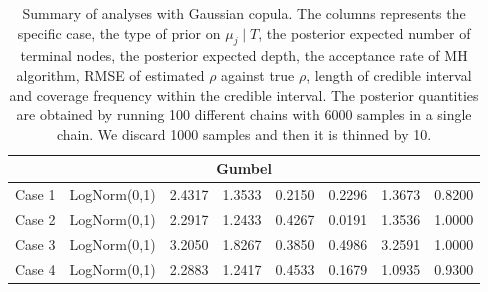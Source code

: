 \documentclass{amsart}
\begin{document}
\begin{table}[ht]
{\begin{tabular}{ll|cccccc}
		\midrule
		\multicolumn{8}{c}{Gumbel} \\
		\midrule
		Case 1 & LogNorm(0,1) & 2.4317 & 1.3533 & 0.2150 & 0.2296 & 1.3673 & 0.8200 \\ 
		Case 2 & LogNorm(0,1) & 2.2917 & 1.2433 & 0.4267 & 0.0191 & 1.3536 & 1.0000 \\ 
		Case 3 & LogNorm(0,1) & 3.2050 & 1.8267 & 0.3850 & 0.4986 & 3.2591 & 1.0000 \\ 
		Case 4 & LogNorm(0,1) & 2.2883 & 1.2417 & 0.4533 & 0.1679 & 1.0935 & 0.9300 \\ 
		\bottomrule
		\end{tabular}}
	\caption{Summary of analyses with Gaussian copula. The columns represents the specific case, the type of prior on $\mu_j\mid T$, the posterior expected number of terminal nodes, the posterior expected depth, the acceptance rate of MH algorithm, RMSE of estimated $\rho$ against true $\rho$, length of credible interval and coverage frequency within the credible interval. The posterior quantities are obtained by running 100 different chains with 6000 samples in a single chain. We discard 1000 samples and then it is thinned by 10.}
	\label{tab:gauss:summary}
\end{table}
\end{document}
